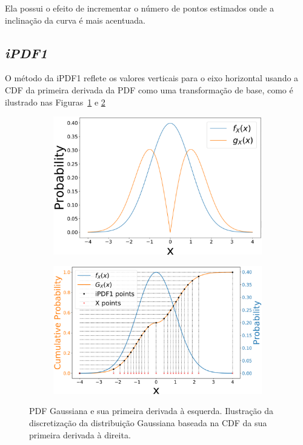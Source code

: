 Ela possui o efeito de incrementar o número de pontos estimados onde a inclinação da curva é mais acentuada.

\subsection{\textit{iPDF1}}

O método da \ac{iPDF1} reflete os valores verticais para o eixo horizontal usando a \ac{CDF} da primeira derivada da \ac{PDF} como uma transformação de base, como é ilustrado nas Figuras~\ref{fig:dPDF1} e \ref{fig:dPDF2}

\begin{figure}[!ht]
	\centering
	\begin{subfigure}[b]{0.44\textwidth}
		\centering 
		\includegraphics[width=\textwidth]{./figuras/dpdf1}
		\caption{}
		\label{fig:dPDF1}
	\end{subfigure}
	\hfill
	\begin{subfigure}[b]{0.47\textwidth}
		\centering 
		\includegraphics[width=\textwidth]{./figuras/dpdf2}
		\caption{}
		\label{fig:dPDF2}
	\end{subfigure}
	\caption{PDF Gaussiana e sua primeira derivada à esquerda. Ilustração da discretização da distribuição Gaussiana baseada na CDF da sua primeira derivada à direita.}
	\label{fig:dPDF}
\end{figure}


